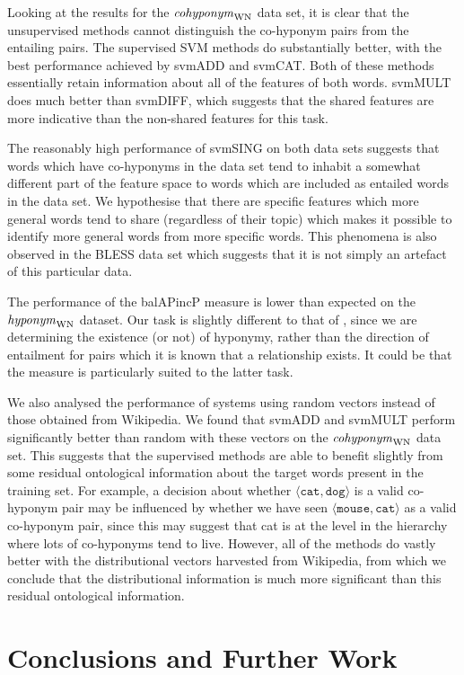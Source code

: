 \documentclass[11pt]{article}
\newcommand\entWN{\mbox{\em hyponym\/}_{\mbox{\scriptsize WN}}}
\newcommand\coordWN{\mbox{\em cohyponym\/}_{\mbox{\scriptsize WN}}}
\begin{document}
Looking at the results for the $\coordWN$ data set, it is clear that the unsupervised methods cannot distinguish the co-hyponym pairs from the entailing pairs.  The supervised SVM methods do substantially better, with the best performance achieved by svmADD and svmCAT.  Both of these methods essentially retain information about all of the features of both words.  svmMULT does much better than svmDIFF, which suggests that the shared features are more indicative than the non-shared features for this task. 

The reasonably high performance of svmSING on both data sets suggests that words which have co-hyponyms in the data set tend to inhabit a somewhat different part of the feature space to words which are included as entailed words in the data set.  We hypothesise that there are specific features which more general words tend to share (regardless of their topic) which makes it possible to identify more general words from more specific words.  This phenomena is also observed in the BLESS data set which suggests that it is not simply an artefact of this particular data.

The performance of the balAPincP measure is lower than expected on the
$\entWN$ dataset. Our task is slightly different to that of
\cite{Kotlerman2010}, since we are determining the existence (or not)
of hyponymy, rather than the direction of entailment for pairs which
it is known that a relationship exists. It could be that the measure
is particularly suited to the latter task.

We also analysed the performance of systems using random vectors
instead of those obtained from Wikipedia. We found that svmADD and
svmMULT perform significantly better than random with these vectors on
the $\coordWN$ data set.  This suggests that the supervised methods
are able to benefit slightly from some residual ontological
information about the target words present in the training set.  For
example, a decision about whether
$\langle\texttt{cat},\texttt{dog}\rangle$ is a valid co-hyponym pair
may be influenced by whether we have seen
$\langle\texttt{mouse},\texttt{cat}\rangle$ as a valid co-hyponym
pair, since this may suggest that cat is at the level in the hierarchy
where lots of co-hyponyms tend to live.  However, all of the methods
do vastly better with the distributional vectors harvested from
Wikipedia, from which we conclude that the distributional information
is much more significant than this residual ontological information.

\section{Conclusions and Further Work}
\end{document}
